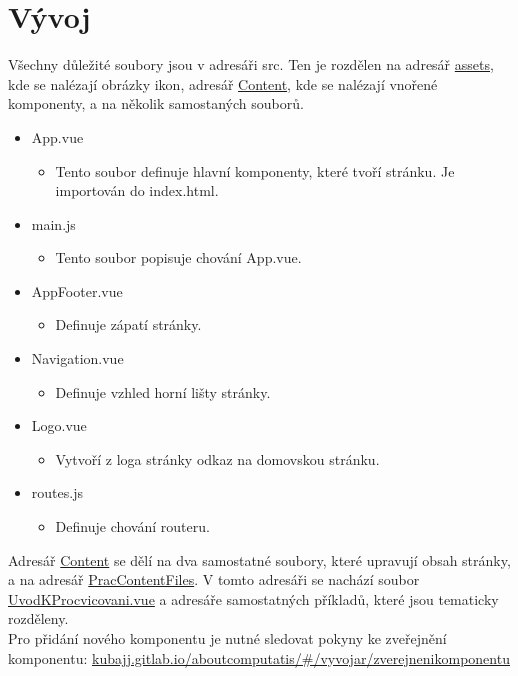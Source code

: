 \documentclass[
]{article}
\begin{document}
\section{Vývoj}
Všechny důležité soubory jsou v adresáři src. Ten je rozdělen na adresář \href{https://gitlab.com/kubajj/computatis/tree/master/src/assets}{assets}, kde se nalézají obrázky ikon,
adresář \href{https://gitlab.com/kubajj/computatis/tree/master/src/Content}{Content}, kde se nalézají vnořené komponenty, a na několik samostaných souborů.
\begin{itemize}
  \item App.vue
  \begin{itemize}
    \item Tento soubor definuje hlavní komponenty, které tvoří stránku. Je importován do index.html.
  \end{itemize}
  \item main.js  
  \begin{itemize}
    \item Tento soubor popisuje chování App.vue.
  \end{itemize}
  \item AppFooter.vue
  \begin{itemize}
    \item Definuje zápatí stránky.
  \end{itemize}
  \item Navigation.vue
  \begin{itemize}
    \item Definuje vzhled horní lišty stránky.
  \end{itemize}
  \item Logo.vue
  \begin{itemize}
    \item Vytvoří z loga stránky odkaz na domovskou stránku. 
  \end{itemize}
  \item routes.js
  \begin{itemize}
    \item Definuje chování routeru.
  \end{itemize}
\end{itemize}
Adresář \href{https://gitlab.com/kubajj/computatis/tree/master/src/Content}{Content} se dělí na dva samostatné soubory, které upravují obsah stránky, a na adresář 
\href{https://gitlab.com/kubajj/computatis/tree/master/src/Content/PracContentFiles}{PracContentFiles}. V tomto adresáři se nachází soubor 
\href{https://gitlab.com/kubajj/computatis/blob/master/src/Content/PracContentFiles/UvodKProcvicovani.vue}{UvodKProcvicovani.vue} a adresáře samostatných příkladů,
které jsou tematicky rozděleny.\\ Pro přidání nového komponentu je nutné sledovat pokyny ke zveřejnění komponentu:
\href{https://kubajj.gitlab.io/aboutcomputatis/#/vyvojar/zverejnenikomponentu}{kubajj.gitlab.io/aboutcomputatis/\#/vyvojar/zverejnenikomponentu}
\end{document}
